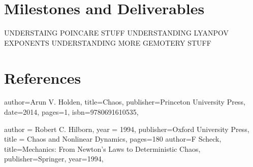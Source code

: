 \documentclass[12pt,a4paper]{amsart}
\begin{document}
\newpage

\section{Milestones and Deliverables}

UNDERSTAING POINCARE STUFF
UNDERSTANDING LYANPOV EXPONENTS
UNDERSTANDING MORE GEMOTERY STUFF

\section*{References} 
\begin{biblist}
    {
      author={Arun V. Holden},
      title={Chaos},
      publisher={Princeton University Press},
      date={2014},
      pages={1},
      isbn={9780691610535},
    }
    
        {
        author = {Robert C. Hilborn},
        year = {1994},
        publisher={Oxford University Press},
        title = {Chaos and Nonlinear Dynamics},
        pages={180}
        }
        {
        author={F Scheck},
        title={Mechanics: From Newton's Laws to Deterministic Chaos},
        publisher={Springer},
        year={1994}, 
        }

\end{biblist}
\end{document}
